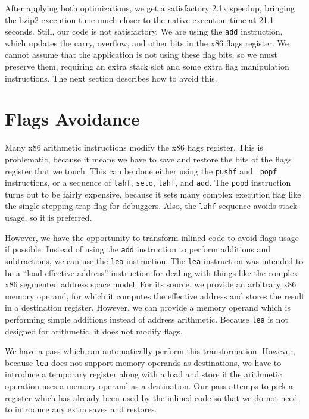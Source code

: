 After applying both optimizations, we get a satisfactory 2.1x speedup, bringing
the bzip2 execution time much closer to the native execution time at 21.1
seconds.  Still, our code is not satisfactory.  We are using the {\tt add}
instruction, which updates the carry, overflow, and other bits in the x86 flags
register.  We cannot assume that the application is not using these flag bits,
so we must preserve them, requiring an extra stack slot and some extra flag
manipulation instructions.  The next section describes how to avoid this.

\section{Flags Avoidance}

Many x86 arithmetic instructions modify the x86 flags register.  This is
problematic, because it means we have to save and restore the bits of the flags
register that we touch.  This can be done either using the {\tt pushf} and {\tt
popf} instructions, or a sequence of {\tt lahf}, {\tt seto}, {\tt lahf}, and
{\tt add}.  The {\tt popd} instruction turns out to be fairly expensive, because
it sets many complex execution flag like the single-stepping trap flag for
debuggers.  Also, the {\tt lahf} sequence avoids stack usage, so it is
preferred.

However, we have the opportunity to transform inlined code to avoid flags usage
if possible.  Instead of using the {\tt add} instruction to perform additions
and subtractions, we can use the {\tt lea} instruction.  The {\tt lea}
instruction was intended to be a ``load effective address'' instruction for
dealing with things like the complex x86 segmented address space model.  For its
source, we provide an arbitrary x86 memory operand, for which it computes the
effective address and stores the result in a destination register.  However, we
can provide a memory operand which is performing simple additions instead of
address arithmetic.  Because {\tt lea} is not designed for arithmetic, it does
not modify flags.

We have a pass which can automatically perform this transformation.  However,
because {\tt lea} does not support memory operands as destinations, we have to
introduce a temporary register along with a load and store if the arithmetic
operation uses a memory operand as a destination.  Our pass attemps to pick a
register which has already been used by the inlined code so that we do not need
to introduce any extra saves and restores.

